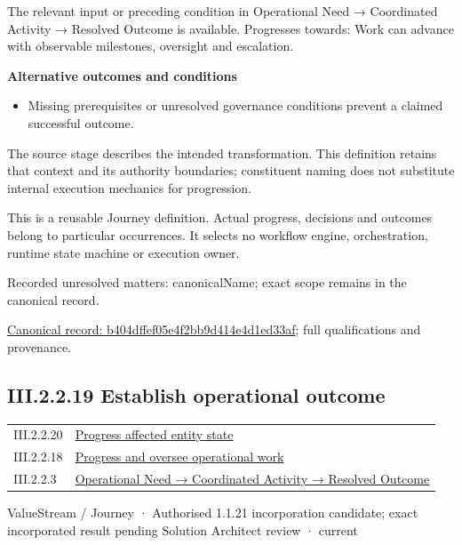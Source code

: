 The relevant input or preceding condition in Operational Need → Coordinated Activity → Resolved Outcome is available. Progresses towards: Work can advance with observable milestones, oversight and escalation.



\par\medskip\textbf{Alternative outcomes and conditions}\par


\begin{itemize}


\item Missing prerequisites or unresolved governance conditions prevent a claimed successful outcome.

\end{itemize}


The source stage describes the intended transformation. This definition retains that context and its authority boundaries; constituent naming does not substitute internal execution mechanics for progression.



This is a reusable Journey definition. Actual progress, decisions and outcomes belong to particular occurrences. It selects no workflow engine, orchestration, runtime state machine or execution owner.


{\small Recorded unresolved matters: canonicalName; exact scope remains in the canonical record.}\par
{\footnotesize \href{../../../../../../../continuum/strategy/value-stream/b404dffef05e4f2bb9d414e4d1ed33af.md}{Canonical record: b404dffef05e4f2bb9d414e4d1ed33af}; full qualifications and provenance.}\par
\subsection*{III.2.2.19 Establish operational outcome}
\label{navigation:III.2.2.19}

\begin{longtable}{p{.22\linewidth}p{.73\linewidth}}
III.2.2.20 & \hyperref[element:57880d06fd0b47d2a19d695afd7d48fc]{Progress affected entity state} \\
III.2.2.18 & \hyperref[element:b404dffef05e4f2bb9d414e4d1ed33af]{Progress and oversee operational work} \\
III.2.2.3 & \hyperref[element:beea615ca7b34bbcbd0ad3a2a6ab2cff]{Operational Need → Coordinated Activity → Resolved Outcome} \\
\end{longtable}
\label{element:79f756815e3645eb82a150870dc12502}
{\small ValueStream / Journey · Authorised 1.1.21 incorporation candidate; exact incorporated result pending Solution Architect review · current}\par

